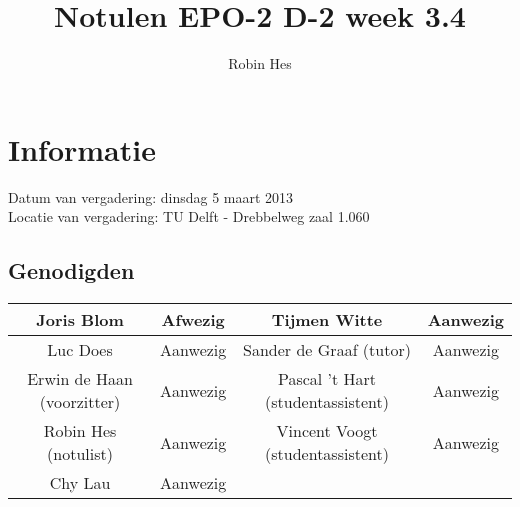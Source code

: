 \documentclass{article}
\begin{document}
\title{Notulen EPO-2 D-2 week 3.4}
\author{Robin Hes}
\maketitle
\section*{Informatie}
Datum van vergadering: dinsdag 5 maart 2013 \\
Locatie van vergadering: TU Delft - Drebbelweg zaal 1.060
\subsection*{Genodigden}
\begin{center}
\begin{tabular}{|c |c |c |c |}
	\hline
	Joris Blom & Afwezig & Tijmen Witte & Aanwezig \\
	\hline
	Luc Does & Aanwezig & Sander de Graaf (tutor) & Aanwezig \\
	\hline
	Erwin de Haan (voorzitter) & Aanwezig & Pascal 't Hart (studentassistent) & Aanwezig \\
	\hline
	Robin Hes (notulist) & Aanwezig & Vincent Voogt (studentassistent) & Aanwezig \\
	\hline
	Chy Lau & Aanwezig & & \\
	\hline
\end{tabular}
\end{center}
\end{document}
